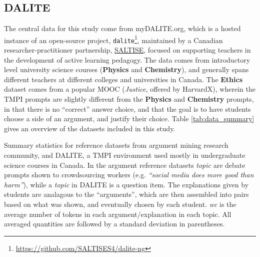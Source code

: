 \documentclass[notitlepage,12pt]{jedm}
\begin{document}
\subsection{DALITE}\label{sec:dataset_dalite}
The central data for this study come from myDALITE.org, which is a hosted 
instance of an open-source project, 
\verb|dalite|\footnote{\url{https://github.com/SALTISES4/dalite-ng}}, 
maintained by a Canadian researcher-practitioner partnership, 
\href{saltise.ca}{SALTISE}, focused on supporting teachers in the development 
of active learning pedagogy.
The data comes from introductory level university science courses 
(\textbf{Physics} and \textbf{Chemistry}), and generally spans different 
teachers at different colleges and universities in Canada. 
The \textbf{Ethics} dataset comes from a popular MOOC (\textit{Justice}, 
offered by HarvardX), wherein the TMPI prompts 
are slightly different from the \textbf{Physics} and \textbf{Chemistry} 
prompts, in that there is no ``correct'' answer choice, and that the goal is to 
have students choose a side of an argument, and justify their choice.
Table \ref{tab:data_summary} gives an overview of the datasets included in this 
study.


\begin{table}
	
	\caption{
		Summary statistics for reference datasets from argument mining research 
		community, and DALITE, a TMPI environment used mostly in undergraduate 
		science courses in Canada. 
		In the argument reference datasets \textit{topic} are debate prompts 
		shown to crowdsourcing workers (e.g. \textit{``social media does more 
		good than harm''}), while a \textit{topic} in DALITE is a question item.
		The explanations given by students are analagous to the ``arguments'',  
		which are then assembled into pairs based on what was shown, and 
		eventually chosen by each student.
		\textit{wc} is the average number of tokens in each 
		argument/explanation in each topic.
		All averaged quantities are followed by a standard deviation in 
		parentheses.
	}
	\label{tab:data_summary}
\end{table}
\end{document}

